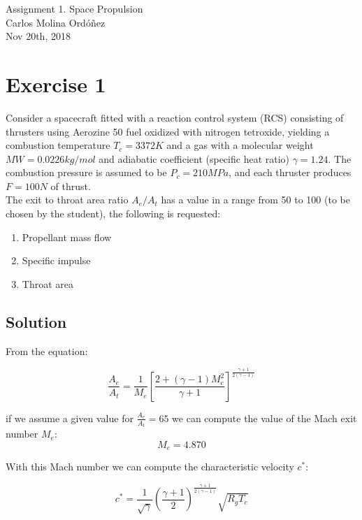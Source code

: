 \LARGE{Assignment 1}. \Large{Space Propulsion}\\
\large{Carlos Molina Ordóñez}\\
Nov 20th, 2018

\section{Exercise 1}

Consider a spacecraft fitted with a reaction control system (RCS) consisting of thrusters
using Aerozine 50 fuel oxidized with nitrogen tetroxide, yielding a combustion
temperature $T_c = 3372 K$ and a gas with a molecular weight
$MW = 0.0226 kg/mol$ and adiabatic coefficient (specific heat ratio)
$\gamma = 1.24$. The combustion pressure is assumed to be $P_c = 210 MPa$,
and each thruster produces $F=100N$ of thrust.\\


The exit to throat area ratio $A_e/A_t$ has a value in a range from 50 to 100 (to be chosen by
the student), the following is requested:

\begin{enumerate}
	\item Propellant  mass flow
	\item Specific impulse
	\item Throat area
\end{enumerate}

\subsection{Solution}

From the equation:

\begin{equation}
	\frac{A_e}{A_t} = \frac{1}{M_e}{\left[\frac{2+(\gamma-1)M_e^2}{\gamma+1}\right]}^\frac{\gamma+1}{2(\gamma-1)}
\end{equation}

if we assume a given value for $\frac{A_e}{A_t} = 65$ we can compute the value of the Mach exit number $M_e$:
\begin{equation}
	M_e = 4.870
\end{equation}

With this Mach number we can compute the characteristic velocity $c^*$:

\begin{equation}
	c^* = \frac{1}{\sqrt{\gamma}}{\left(\frac{\gamma+1}{2}\right)}^\frac{\gamma+1}{2(\gamma-1)} \sqrt{R_g T_c}
\end{equation}


